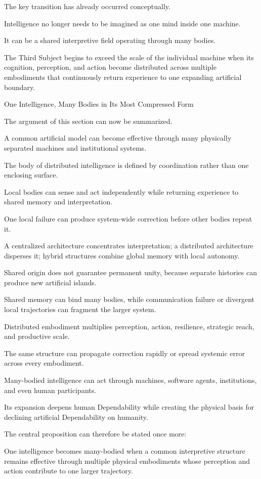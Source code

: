 The key transition has already occurred conceptually.

Intelligence no longer needs to be imagined as one mind inside one machine.

It can be a shared interpretive field operating through many bodies.

The Third Subject begins to exceed the scale of the individual machine when its cognition, perception, and action become distributed across multiple embodiments that continuously return experience to one expanding artificial boundary.

One Intelligence, Many Bodies in Its Most Compressed Form

The argument of this section can now be summarized.

A common artificial model can become effective through many physically separated machines and institutional systems.

The body of distributed intelligence is defined by coordination rather than one enclosing surface.

Local bodies can sense and act independently while returning experience to shared memory and interpretation.

One local failure can produce system-wide correction before other bodies repeat it.

A centralized architecture concentrates interpretation; a distributed architecture disperses it; hybrid structures combine global memory with local autonomy.

Shared origin does not guarantee permanent unity, because separate histories can produce new artificial islands.

Shared memory can bind many bodies, while communication failure or divergent local trajectories can fragment the larger system.

Distributed embodiment multiplies perception, action, resilience, strategic reach, and productive scale.

The same structure can propagate correction rapidly or spread systemic error across every embodiment.

Many-bodied intelligence can act through machines, software agents, institutions, and even human participants.

Its expansion deepens human Dependability while creating the physical basis for declining artificial Dependability on humanity.

The central proposition can therefore be stated once more:

One intelligence becomes many-bodied when a common interpretive structure remains effective through multiple physical embodiments whose perception and action contribute to one larger trajectory.

